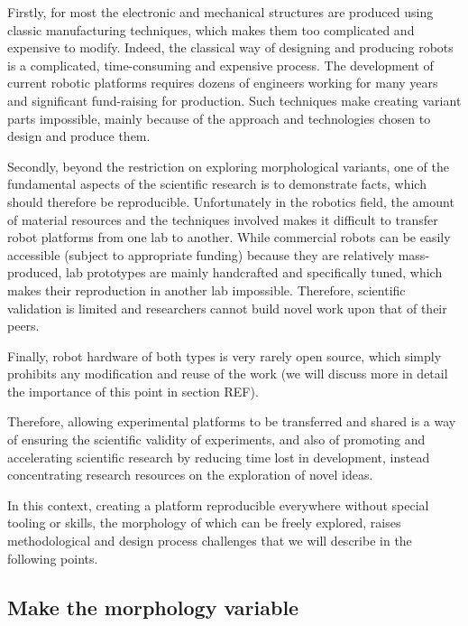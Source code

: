 Firstly, for most the electronic and mechanical structures are produced using classic manufacturing techniques,  which makes them too complicated and expensive to modify. Indeed, the classical way of designing and producing robots is a complicated, time-consuming and expensive process. The development of current robotic platforms requires dozens of engineers working for many years and significant fund-raising for production. Such techniques make creating variant parts impossible, mainly because of the approach and technologies chosen to design and produce them.


Secondly, beyond the restriction on exploring morphological variants, one of the fundamental aspects of the scientific research is to demonstrate facts, which should therefore be reproducible. Unfortunately in the robotics field, the amount of material resources and the techniques involved makes it difficult to transfer robot platforms from one lab to another. While commercial robots can be easily accessible (subject to appropriate funding) because they are relatively mass-produced, lab prototypes are mainly handcrafted and specifically tuned, which makes their  reproduction in another lab impossible. Therefore, scientific validation is limited and researchers cannot build novel work upon that of their peers.

Finally, robot hardware of both types is very rarely open source, which simply prohibits any modification and reuse of the work (we will discuss more in detail the importance of this point in section REF).

Therefore, allowing  experimental platforms to be transferred and shared is a way of ensuring the scientific validity of experiments, and also of promoting and accelerating scientific research by reducing time lost in development, instead concentrating research resources on the exploration of novel ideas.


In this context, creating a platform reproducible everywhere without special tooling or skills, the morphology of which can be freely explored, raises methodological and design process challenges that we will describe in the following points.

\subsection{Make the morphology variable} %

